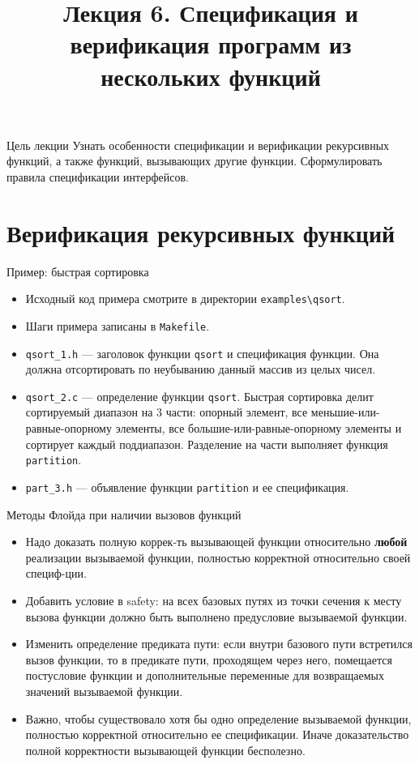 \documentclass[hyperref={unicode=true}]{beamer}
\title{Лекция 6. Спецификация и верификация программ из нескольких функций}
\author{}
\date{}
\begin{document}
	\begin{frame}{}
		\titlepage
	\end{frame}

    \begin{frame}{Цель лекции}
    Узнать особенности спецификации и верификации рекурсивных функций,
    а также функций, вызывающих другие функции. Сформулировать правила
    спецификации интерфейсов.
    \end{frame}

    \section{Верификация рекурсивных функций}

    \begin{frame}{Пример: быстрая сортировка}
    \begin{itemize}
    \item Исходный код примера смотрите в директории \texttt{examples\textbackslash qsort}.
    \item Шаги примера записаны в \texttt{Makefile}.
    \item \texttt{qsort\_1.h} --- заголовок функции \texttt{qsort} и спецификация функции.
    Она должна отсортировать по неубыванию данный массив из целых чисел.
    \item \texttt{qsort\_2.c} --- определение функции \texttt{qsort}. Быстрая сортировка делит
    сортируемый диапазон на 3 части: опорный элемент, все меньшие-или-равные-опорному элементы,
    все большие-или-равные-опорному элементы и сортирует каждый поддиапазон. Разделение на части
    выполняет функция \texttt{partition}.
    \item \texttt{part\_3.h} --- объявление функции \texttt{partition} и ее спецификация.
    \end{itemize}
    \end{frame}

    \begin{frame}{Методы Флойда при наличии вызовов функций}
    \begin{itemize}
    \item Надо доказать полную коррек-ть вызывающей функции относительно
    \textbf{любой} реализации вызываемой функции, полностью корректной относительно своей специф-ции.
    \item Добавить условие в safety: на всех базовых путях из точки сечения к месту вызова функции
    должно быть выполнено предусловие вызываемой функции.
    \item Изменить определение предиката пути: если внутри базового пути встретился вызов функции,
    то в предикате пути, проходящем через него, помещается постусловие функции и дополнительные переменные
    для возвращаемых значений вызываемой функции.
    \item Важно, чтобы существовало хотя бы одно определение вызываемой функции, полностью корректной
    относительно ее спецификации. Иначе доказательство полной корректности вызывающей функции бесполезно.
    \end{itemize}
    \end{frame}
\end{document}
